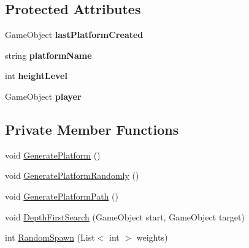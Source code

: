 \subsection*{Protected Attributes}
\begin{DoxyCompactItemize}
\item 
\mbox{\label{class_platforms_generation_controller_a0acd0baa788817b39022c398954664b3}} 
Game\+Object {\bfseries last\+Platform\+Created}
\item 
\mbox{\label{class_platforms_generation_controller_ada6e1cb66764417600354163d48b4840}} 
string {\bfseries platform\+Name}
\item 
\mbox{\label{class_platforms_generation_controller_a04a035bdffe90de10c6041febdefd909}} 
int {\bfseries height\+Level}
\item 
\mbox{\label{class_platforms_generation_controller_aee495c9238b4a0237e718dc00152f55f}} 
Game\+Object {\bfseries player}
\end{DoxyCompactItemize}
\subsection*{Private Member Functions}
\begin{DoxyCompactItemize}
\item 
void \mbox{\hyperlink{class_platforms_generation_controller_a6f706a8a5a3a9e6fbc1714283493c6ef}{Generate\+Platform}} ()
\item 
void \mbox{\hyperlink{class_platforms_generation_controller_accf9694cf731427ae0d6f89741f9734d}{Generate\+Platform\+Randomly}} ()
\item 
void \mbox{\hyperlink{class_platforms_generation_controller_a3114332440f809a82fb41248dbe275d6}{Generate\+Platform\+Path}} ()
\item 
void \mbox{\hyperlink{class_platforms_generation_controller_ad049559a838cc96b0688d34a91d2f510}{Depth\+First\+Search}} (Game\+Object start, Game\+Object target)
\item 
int \mbox{\hyperlink{class_platforms_generation_controller_a0a5e7c057ba329490925ae1c4d21a06b}{Random\+Spawn}} (List$<$ int $>$ weights)
\end{DoxyCompactItemize}
